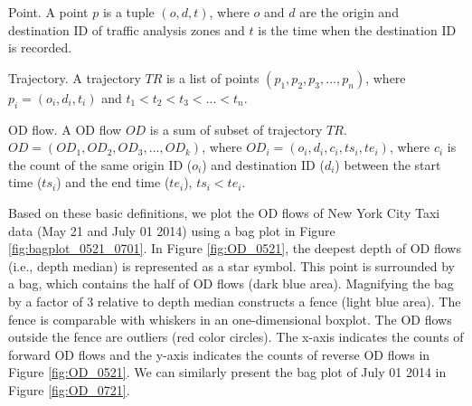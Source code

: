 \documentclass[a4paper,UKenglish]{lipics-v2016}
\begin{document}
\begin{definition}{Point.}
	A point $p$ is a tuple $(o,d,t)$, where $o$ and $d$  are the origin and destination ID of  traffic analysis zones and $t$ is the time when the destination ID is recorded.
\end{definition}

\begin{definition}{Trajectory.}
	A trajectory $TR$ is a list of points $(p_1, p_2, p_3,...,p_n)$, where $p_i = (o_i,d_i,t_i)$ and $t_1<t_2<t_3<...<t_n$.
\end{definition}

\begin{definition}{OD flow.}
	A OD flow $OD$ is a sum of subset of trajectory $TR$. $OD = (OD_1, OD_2, OD_3,...,OD_k)$, where $OD_i = (o_i,d_i,c_i,ts_i, te_i)$, where $c_i$ is the count of the same origin ID ($o_i$) and destination ID ($d_i$) between the start time ($ts_i$) and the end time ($te_i$), $ts_i<te_i$.
\end{definition}

Based on these basic definitions, we plot the OD flows of New York City Taxi data (May 21 and July 01 2014) using a bag plot in Figure \ref{fig:bagplot_0521_0701}. In Figure \ref{fig:OD_0521}, the deepest depth of OD flows (i.e., depth median) is represented as a star symbol. This point is surrounded by a bag, which contains the half of OD flows (dark blue area). Magnifying the bag by a factor of 3 relative to depth median constructs a fence (light blue area). The fence is comparable with whiskers in an one-dimensional boxplot. The OD flows outside the fence are outliers (red color circles). The x-axis indicates the counts of forward OD flows and the y-axis indicates  the counts of reverse OD flows in Figure \ref{fig:OD_0521}. We can similarly present the bag plot of July 01 2014 in Figure \ref{fig:OD_0721}.
\end{document}
